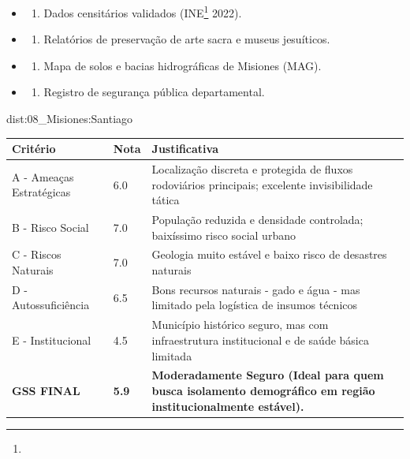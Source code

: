 {\begin{itemize}
\tightlist
\item
  \begin{enumerate}
  \def\labelenumi{\arabic{enumi})}
  \tightlist
  \item
    Dados censitários validados (INE\footnote{\fineINE} 2022).
  \end{enumerate}
\item
  \begin{enumerate}
  \def\labelenumi{\arabic{enumi})}
  \setcounter{enumi}{1}
  \tightlist
  \item
    Relatórios de preservação de arte sacra e museus jesuíticos.
  \end{enumerate}
\item
  \begin{enumerate}
  \def\labelenumi{\arabic{enumi})}
  \setcounter{enumi}{2}
  \tightlist
  \item
    Mapa de solos e bacias hidrográficas de Misiones (MAG).
  \end{enumerate}
\item
  \begin{enumerate}
  \def\labelenumi{\arabic{enumi})}
  \setcounter{enumi}{3}
  \tightlist
  \item
    Registro de segurança pública departamental.
  \end{enumerate}
\end{itemize}}{dist:08_Misiones:Santiago}
\begin{table}[ht!]
\small \begin{tabular}{p{3.0cm}p{0.8cm}p{6.0cm}} \toprule
\textbf{Critério} & \textbf{Nota} & \textbf{Justificativa} \\ \midrule
A - Ameaças Estratégicas & 6.0 & Localização discreta e protegida de fluxos rodoviários principais; excelente invisibilidade tática \\
B - Risco Social & 7.0 & População reduzida e densidade controlada; baixíssimo risco social urbano \\
C - Riscos Naturais & 7.0 & Geologia muito estável e baixo risco de desastres naturais \\
D - Autossuficiência & 6.5 & Bons recursos naturais - gado e água - mas limitado pela logística de insumos técnicos \\
E - Institucional & 4.5 & Município histórico seguro, mas com infraestrutura institucional e de saúde básica limitada \\
\midrule \textbf{GSS FINAL} & \textbf{5.9} & \textbf{Moderadamente Seguro (Ideal para quem busca isolamento demográfico em região institucionalmente estável).} \\ \bottomrule \end{tabular}
\end{table}
